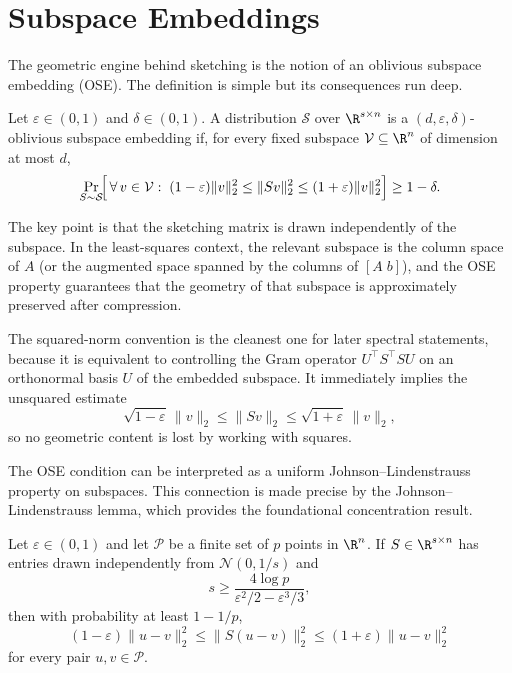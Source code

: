 \section{Subspace Embeddings}

The geometric engine behind sketching is the notion of an oblivious subspace embedding (OSE). The definition is simple but its consequences run deep.

\begin{definition} \label{def:ose}
	Let \(\varepsilon \in (0,1)\) and \(\delta \in (0,1)\). A distribution \(\mathcal{S}\) over \(\R^{s \times n}\) is a \((d,\varepsilon,\delta)\)-oblivious subspace embedding if, for every fixed subspace \(\mathcal{V} \subseteq \R^n\) of dimension at most \(d\),
	\[
		\Pr_{S \sim \mathcal{S}}\!\Bigl[\,\forall\, v \in \mathcal{V}:\; (1-\varepsilon)\|v\|_2^2 \le \|Sv\|_2^2 \le (1+\varepsilon)\|v\|_2^2\Bigr] \ge 1 - \delta.
	\]
\end{definition}

The key point is that the sketching matrix is drawn independently of the subspace. In the least-squares context, the relevant subspace is the column space of \(A\) (or the augmented space spanned by the columns of \([A\; b]\)), and the OSE property guarantees that the geometry of that subspace is approximately preserved after compression.

The squared-norm convention is the cleanest one for later spectral statements,
because it is equivalent to controlling the Gram operator \(U^\top S^\top S U\) on
an orthonormal basis \(U\) of the embedded subspace. It immediately implies the
unsquared estimate
\[
	\sqrt{1-\varepsilon}\,\|v\|_2 \le \|Sv\|_2 \le \sqrt{1+\varepsilon}\,\|v\|_2,
\]
so no geometric content is lost by working with squares.

The OSE condition can be interpreted as a uniform Johnson--Lindenstrauss property on subspaces. This connection is made precise by the Johnson--Lindenstrauss lemma, which provides the foundational concentration result.

\begin{lemma} \label{lem:jl}
	Let \(\varepsilon \in (0,1)\) and let \(\mathcal{P}\) be a finite set of \(p\) points in \(\R^n\). If \(S \in \R^{s \times n}\) has entries drawn independently from \(\mathcal{N}(0,1/s)\) and
	\[
		s \ge \frac{4\log p}{\varepsilon^2/2 - \varepsilon^3/3},
	\]
	then with probability at least \(1 - 1/p\),
	\[
		(1-\varepsilon)\|u - v\|_2^2 \le \|S(u-v)\|_2^2 \le (1+\varepsilon)\|u - v\|_2^2
	\]
	for every pair \(u,v \in \mathcal{P}\).
\end{lemma}

